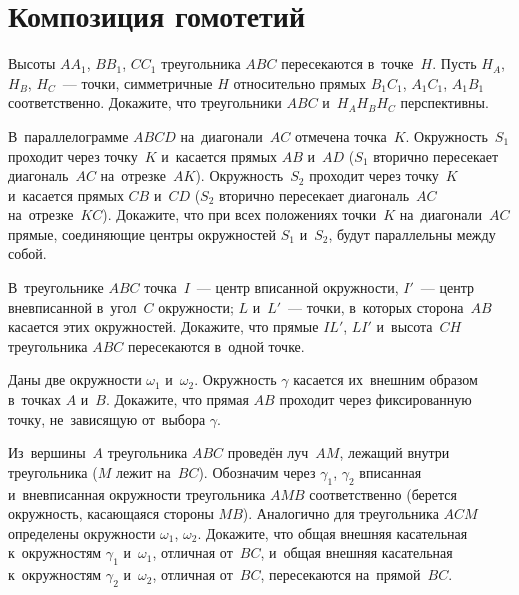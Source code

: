
\section*{Композиция гомотетий}


\begin{problems}

\item
Высоты $A A_1$, $B B_1$, $C C_1$ треугольника $ABC$ пересекаются в~точке~$H$.
Пусть $H_A$, $H_B$, $H_C$~--- точки, симметричные $H$ относительно прямых
$B_1 C_1$, $A_1 C_1$, $A_1 B_1$ соответственно.
Докажите, что треугольники $ABC$ и~$H_A H_B H_C$ перспективны.

\item
В~параллелограмме $ABCD$ на~диагонали~$AC$ отмечена точка~$K$.
Окружность~$S_1$ проходит через точку~$K$ и~касается прямых $AB$ и~$AD$
($S_1$ вторично пересекает диагональ~$AC$ на~отрезке~$AK$).
Окружность~$S_2$ проходит через точку~$K$ и~касается прямых $CB$ и~$CD$
($S_2$ вторично пересекает диагональ~$AC$ на~отрезке~$KC$).
Докажите, что при всех положениях точки~$K$ на~диагонали~$AC$ прямые,
соединяющие центры окружностей $S_1$ и~$S_2$, будут параллельны между собой.

\item
В~треугольнике $ABC$ точка~$I$~--- центр вписанной окружности,
$I'$~--- центр вневписанной в~угол~$C$ окружности;
$L$ и~$L'$~--- точки, в~которых сторона~$AB$ касается этих окружностей.
Докажите, что прямые $IL'$, $LI'$ и~высота~$CH$ треугольника $ABC$ пересекаются
в~одной точке.

\item
Даны две окружности $\omega_1$ и~$\omega_2$.
Окружность $\gamma$ касается их~внешним образом в~точках $A$ и~$B$.
Докажите, что прямая $AB$ проходит через фиксированную точку, не~зависящую
от~выбора $\gamma$.

\item
Из~вершины~$A$ треугольника $ABC$ проведён луч~$AM$, лежащий внутри
треугольника ($M$ лежит на~$BC$).
Обозначим через $\gamma_1$, $\gamma_2$ вписанная и~вневписанная окружности
треугольника $AMB$ соответственно (берется окружность, касающаяся
стороны $MB$).
Аналогично для треугольника $ACM$ определены окружности $\omega_1$, $\omega_2$.
Докажите, что общая внешняя касательная к~окружностям $\gamma_1$ и~$\omega_1$,
отличная от~$BC$, и~общая внешняя касательная к~окружностям $\gamma_2$
и~$\omega_2$, отличная от~$BC$, пересекаются на~прямой~$BC$.


\end{problems}
